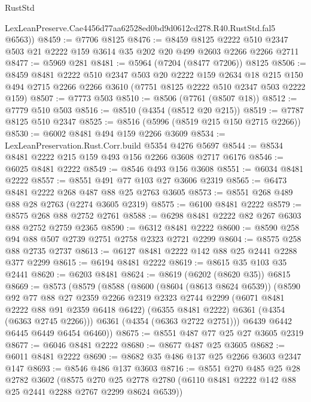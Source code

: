 \begin{lexlean}{RustStd}
\begin{coremodule}
        LexLeanPreserve.Cae4456d77aa62528ed0bd9d0612cd278.R40.RustStd.fal5
        @6563))
@8459 := @7706 @8125
@8476 := @8459
    @8125
    @2222
    @510
    @2347
    @503
    @21
    @2222
    @159
    @3614
    @35
    @202
    @20
    @499
    @2603
    @2266
    @2266
    @2711
@8477 := @5969 @281
@8481 := @5964 (@7204 (@8477 @7206)) @8125
@8506 := @8459
    @8481
    @2222
    @510
    @2347
    @503
    @20
    @2222
    @159
    @2634
    @18
    @215
    @150
    @494
    @2715
    @2266
    @2266
    @3610
    (@7751 @8125 @2222 @510 @2347 @503 @2222 @159)
@8507 := @7773 @503
@8510 := @8506 (@7761 (@8507 @18))
@8512 := @7779 @510 @503
@8516 := @8510 (@4354 (@8512 @20 @215))
@8519 := @7787 @8125 @510 @2347
@8525 := @8516 (@5996 (@8519 @215 @150 @2715 @2266))
@8530 := @6002 @8481 @494 @159 @2266 @3609
@8534 := LexLeanPreservation.Rust.Corr.build @5354 @4276 @5697
@8544 := @8534 @8481 @2222 @215 @159 @493 @156 @2266 @3608 @2717 @6176
@8546 := @6025 @8481 @2222
@8549 := @8546 @493 @156 @3608
@8551 := @6034 @8481 @2222
@8557 := @8551 @491 @77 @103 @27 @3606 @2319
@8565 := @6473 @8481 @2222 @268 @487 @88 @25 @2763 @3605
@8573 := @8551 @268 @489 @88 @28 @2763 (@2274 @3605 @2319)
@8575 := @6100 @8481 @2222
@8579 := @8575 @268 @88 @2752 @2761
@8588 := @6298 @8481 @2222 @82 @267 @6303 @88 @2752 @2759 @2365
@8590 := @6312 @8481 @2222
@8600 := @8590 @258 @94 @88 @507 @2739 @2751 @2758 @2323 @2721 @2299
@8604 := @8575 @258 @88 @2735 @2737
@8613 := @6127 @8481 @2222 @142 @88 @25 @2441 @2288 @377 @2299
@8615 := @6194 @8481 @2222
@8619 := @8615 @35 @103 @35 @2441
@8620 := @6203 @8481
@8624 := @8619 (@6202 (@8620 @35)) @6815
@8669 := @8573
    (@8579
      (@8588
        (@8600
          (@8604 (@8613 @8624 @6539))
          (@8590
            @92
            @77
            @88
            @27
            @2359
            @2266
            @2319
            @2323
            @2744
            @2299
            (@6071 @8481 @2222 @88 @91 @2359 @6418 @6422)
            (@6355 @8481 @2222)
            @6361
            (@4354 (@6363 @2745 @2266)))
          @6361
          (@4354 (@6363 @2722 @2751)))
        @6439
        @6442
        @6445
        @6449
        @6454
        @6460))
@8675 := @8551 @487 @77 @25 @27 @3605 @2319
@8677 := @6046 @8481 @2222
@8680 := @8677 @487 @25 @3605
@8682 := @6011 @8481 @2222
@8690 := @8682 @35 @486 @137 @25 @2266 @3603 @2347 @147
@8693 := @8546 @486 @137 @3603
@8716 := @8551
    @270
    @485
    @25
    @28
    @2782
    @3602
    (@8575
      @270
      @25
      @2778
      @2780
      (@6110 @8481 @2222 @142 @88 @25 @2441 @2288 @2767 @2299 @8624 @6539))

\end{coremodule}
\end{lexlean}
